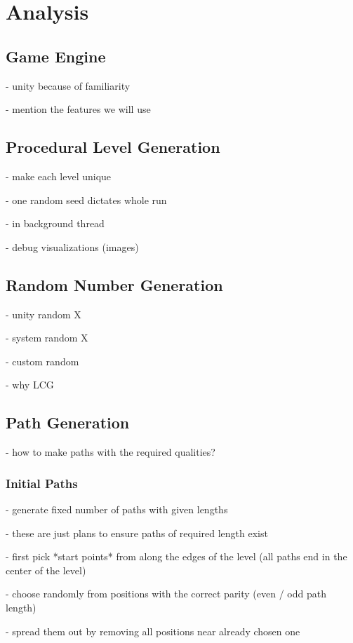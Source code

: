 \chapter{Analysis}

\section{Game Engine}

- unity because of familiarity

- mention the features we will use

\section{Procedural Level Generation}

- make each level unique

- one random seed dictates whole run

- in background thread

- debug visualizations (images)

\section{Random Number Generation}

- unity random X

- system random X

- custom random \checkmark

- why LCG

\section{Path Generation}

- how to make paths with the required qualities?

\subsection{Initial Paths}

- generate fixed number of paths with given lengths

- these are just plans to ensure paths of required length exist

- first pick *start points* from along the edges of the level (all paths end in the center of the level)

- choose randomly from positions with the correct parity (even / odd path length)

- spread them out by removing all positions near already chosen one

